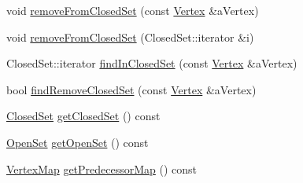 \begin{DoxyCompactItemize}
\item 
void \hyperlink{class_path_algorithm_1_1_a_star_a1b6971a9c5878e859cbdb3270dda93b4}{remove\+From\+Closed\+Set} (const \hyperlink{struct_path_algorithm_1_1_vertex}{Vertex} \&a\+Vertex)
\item 
void \hyperlink{class_path_algorithm_1_1_a_star_a799953993c1255f0ce559f7233d3c926}{remove\+From\+Closed\+Set} (Closed\+Set\+::iterator \&i)
\item 
Closed\+Set\+::iterator \hyperlink{class_path_algorithm_1_1_a_star_a73d9639e838fd55bb392d01238fc967a}{find\+In\+Closed\+Set} (const \hyperlink{struct_path_algorithm_1_1_vertex}{Vertex} \&a\+Vertex)
\item 
bool \hyperlink{class_path_algorithm_1_1_a_star_a843db81c9950c0184ee31627313f5793}{find\+Remove\+Closed\+Set} (const \hyperlink{struct_path_algorithm_1_1_vertex}{Vertex} \&a\+Vertex)
\item 
\hyperlink{namespace_path_algorithm_ac027c23e4b4c237b6eb96fc63d79266f}{Closed\+Set} \hyperlink{class_path_algorithm_1_1_a_star_a94fcc29f04e6398edbd58effbf59b49a}{get\+Closed\+Set} () const 
\item 
\hyperlink{namespace_path_algorithm_a999fc5baea7d1f71e42570630a297029}{Open\+Set} \hyperlink{class_path_algorithm_1_1_a_star_ae419f2d019378d9b4435d862b70da72f}{get\+Open\+Set} () const 
\item 
\hyperlink{namespace_path_algorithm_ac8a52a9740a0bfa959810bd92e08d962}{Vertex\+Map} \hyperlink{class_path_algorithm_1_1_a_star_ac4ce233712c0f7aac44d029e61888581}{get\+Predecessor\+Map} () const 
\end{DoxyCompactItemize}
